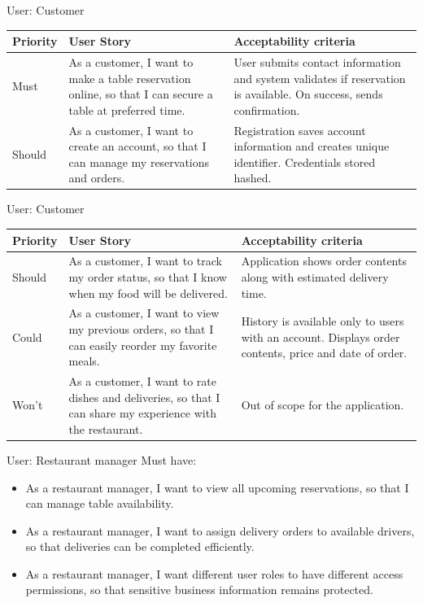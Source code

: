 \documentclass{beamer}
\begin{document}
\begin{frame}{User: Customer}
\begin{tabular}{| l | p{4cm} | p{4cm} |}
\hline
Priority & User Story & Acceptability criteria \\
\hline
Must & As a customer, I want to make a table reservation online, so that I can secure a table at preferred time.
     & User submits contact information and system validates if reservation is available. On success, sends confirmation. \\
\hline
Should & As a customer, I want to create an account, so that I can manage my reservations and orders.
       & Registration saves account information and creates unique identifier. Credentials stored hashed. \\
\hline
\end{tabular}
\end{frame}

\begin{frame}{User: Customer}
\begin{tabular}{| l | p{4cm} | p{4cm} |}
\hline
Priority & User Story & Acceptability criteria \\
\hline
Should & As a customer, I want to track my order status, so that I know when my food will be delivered.
       & Application shows order contents along with estimated delivery time. \\
\hline
Could & As a customer, I want to view my previous orders, so that I can easily reorder my favorite meals.
      & History is available only to users with an account. Displays order contents, price and date of order. \\
\hline
Won't & As a customer, I want to rate dishes and deliveries, so that I can share my experience with the restaurant.
      & Out of scope for the application. \\
\hline
\end{tabular}
\end{frame}

\begin{frame}{User: Restaurant manager}
Must have:
\begin{itemize}
\item As a restaurant manager, I want to view all upcoming reservations, so that I can manage table availability.
\item As a restaurant manager, I want to assign delivery orders to available drivers, so that deliveries can be completed efficiently.
\item As a restaurant manager, I want different user roles to have different access permissions, so that sensitive business information remains protected.
\end{itemize}
\end{frame}
\end{document}
